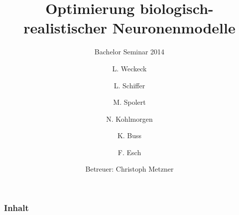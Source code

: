 \documentclass[12pt]{beamer}
\title{Optimierung biologisch-realistischer Neuronenmodelle}
\subtitle{Bachelor Seminar 2014}
\author{L. Weckeck \and L. Schiffer \and M. Spolert \and N. Kohlmorgen \and K. Buss \and F. Esch}
\institute{
  Institut für Robotik und Kognitive Systeme\\
  Universität zu Lübeck
}
\date{Betreuer: Christoph Metzner}
\begin{document}
\begin{frame}
  \titlepage
\end{frame}

\begin{frame}
  \frametitle{Inhalt}
  \tableofcontents
\end{frame}



\end{document}

